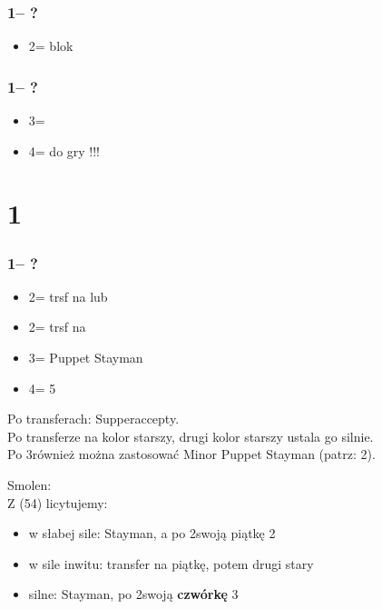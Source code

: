 \documentclass[12pt, a4paper]{report}
\begin{document}
{{{            \subsubsection*{1\hearts -- ?}
            \begin{itemize}
                \item 2\spades = blok
            \end{itemize}
            
            \subsubsection*{1\spades -- ?}
            \begin{itemize}
                \item 3\hearts = \nat\ \inv\ \nf
                \item 4\hearts = do gry !!!
            \end{itemize}
        }

        \section*{\colorbox{blue!30}{1\nt}}
         {
            \subsubsection*{1\nt -- ?}
        \begin{itemize}
            \item 2\spades = trsf na \clubs lub \inv
            \item 2\nt = trsf na \diams
            \item 3\clubs = Puppet Stayman
            \item 4\clubs = 5\spades
        \end{itemize}

        \vspace{0.3cm}
        Po transferach: Supperaccepty.\\
        Po transferze na kolor starszy, drugi kolor starszy ustala go silnie.\\
        Po 3\clubs również można zastosować Minor Puppet Stayman (patrz: 2\nt).

        \vspace{0.3cm}
        Smolen:\\
        Z (54) \major licytujemy:
        \begin{itemize}
            \item w słabej sile: Stayman, a po 2\diams swoją piątkę 2\major
            \item w sile inwitu: transfer na piątkę, potem drugi stary
            \item silne: Stayman, po 2\diams swoją \textbf{czwórkę} 3\major
        \end{itemize}
        }

}}
\end{document}
